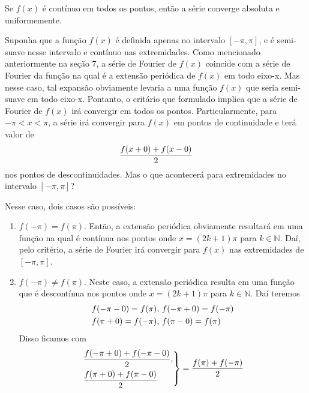 \begin{definicao}
    Se $f(x)$ é contínuo em todos os pontos, então a série converge 
    absoluta e uniformemente.
\end{definicao}

Suponha que a função $f(x)$ é definida apenas no intervalo $[-\pi, \pi]$,
e é semi-suave nesse intervalo e contínuo nas extremidades. Como 
mencionado anteriormente na seção 7, a série de Fourier de $f(x)$ coincide
com a série de Fourier da função na qual é a extensão periódica de $f(x)$
em todo eixo-x. Mas nesse caso, tal expansão obviamente levaria a uma função 
$f(x)$ que seria semi-suave em todo eixo-x. Pontanto, o critário que 
formulado implica que a série de Fourier de $f(x)$ irá convergir em 
todos os pontos. Particularmente, para $-\pi < x < \pi$, a série 
irá convergir para $f(x)$ em pontos de continuidade e terá valor de
\begin{equation}
\notag
    \dfrac{f(x + 0) + f(x - 0)}{2}
\end{equation}
nos pontos de descontinuidades. Mas o que acontecerá para extremidades
no intervalo $[-\pi, \pi]$?

Nesse caso, dois casos são possíveis:
\begin{enumerate}
    \item $f(-\pi) = f(\pi)$. Então, a extensão periódica obviamente
    resultará em uma função na qual é contínua nos pontos onde $x = (2k + 1)\pi$
    para $k \in \mathbb{N}$. Daí, pelo critério, a série de Fourier irá
    convergir para $f(x)$ nas extremidades de $[-\pi,\pi]$.

    \item  $f(-\pi)\neq f(\pi)$. Neste caso, a extensão periódica 
    resulta em uma função que é descontínua nos pontos onde $x = (2k + 1)\pi$
    para $k \in \mathbb{N}$. Daí teremos
    \begin{equation}
    \notag
        \begin{split}
            f(-\pi - 0) = f(\pi)\text{,   } & f(-\pi + 0) = f(-\pi) \\
            f(\pi + 0) = f(-\pi)\text{,   } & f(\pi - 0) = f(\pi)             
        \end{split}
    \end{equation}
    Disso ficamos com
    \begin{equation}
    \notag
        \begin{rcases}
            \dfrac{f(-\pi + 0) + f(-\pi - 0)}{2}, \\
            \dfrac{f(\pi + 0) + f(\pi - 0)}{2}
        \end{rcases}
        =\dfrac{f(\pi) + f(-\pi)}{2}
    \end{equation}
\end{enumerate}

